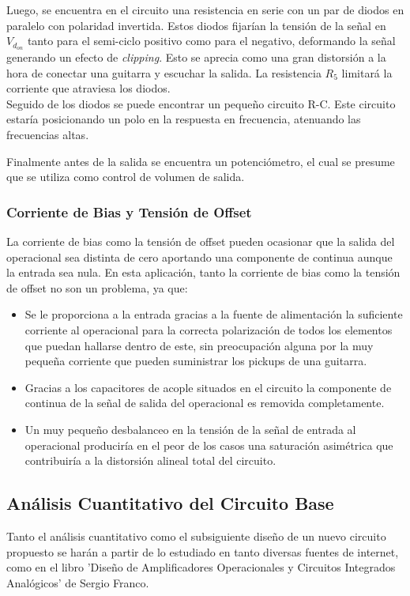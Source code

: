 Luego, se encuentra en el circuito una resistencia en serie con un par de diodos en paralelo con polaridad invertida. Estos diodos fijarían la tensión de la señal en $V_{d_{on}}$ tanto para el semi-ciclo positivo como para el negativo, deformando la señal generando un efecto de \textit{clipping}. Esto se aprecia como una gran distorsión a la hora de conectar una guitarra y escuchar la salida. La resistencia $R_5$ limitará la corriente que atraviesa los diodos.  \\

Seguido de los diodos se puede encontrar un pequeño circuito R-C. Este circuito estaría posicionando un polo en la respuesta en frecuencia, atenuando las frecuencias altas. 

Finalmente antes de la salida se encuentra un potenciómetro, el cual se presume que se utiliza como control de volumen de salida.

\subsubsection{Corriente de Bias y Tensión de Offset}
La corriente de bias como la tensión de offset pueden ocasionar que la salida del operacional sea distinta de cero aportando una componente de continua aunque la entrada sea nula. En esta aplicación, tanto la corriente de bias como la tensión de offset no son un problema, ya que:
\begin{itemize}
\item Se le proporciona a la entrada gracias a la fuente de alimentación la suficiente corriente al operacional para la correcta polarización de todos los elementos que puedan hallarse dentro de este, sin preocupación alguna por la muy pequeña corriente que pueden suministrar los pickups de una guitarra.
\item Gracias a los capacitores de acople situados en el circuito la componente de continua de la señal de salida del operacional es removida completamente.
\item Un muy pequeño desbalanceo en la tensión de la señal de entrada al operacional produciría en el peor de los casos una saturación asimétrica que contribuiría a la distorsión alineal total del circuito.
\end{itemize} 
\break
\subsection{Análisis Cuantitativo del Circuito Base}

Tanto el análisis cuantitativo como el subsiguiente diseño de un nuevo circuito propuesto se harán a partir de lo estudiado en tanto diversas fuentes de internet, como en el libro 'Diseño de Amplificadores Operacionales y Circuitos Integrados Analógicos' de Sergio Franco.

